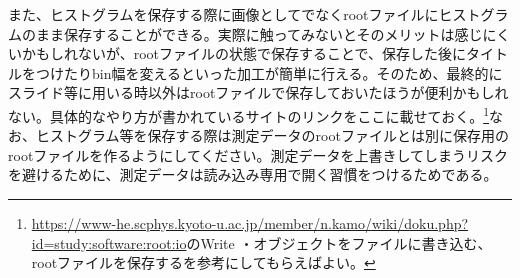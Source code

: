 また、ヒストグラムを保存する際に画像としてでなくrootファイルにヒストグラムのまま保存することができる。実際に触ってみないとそのメリットは感じにくいかもしれないが、rootファイルの状態で保存することで、保存した後にタイトルをつけたりbin幅を変えるといった加工が簡単に行える。そのため、最終的にスライド等に用いる時以外はrootファイルで保存しておいたほうが便利かもしれない。具体的なやり方が書かれているサイトのリンクをここに載せておく。\footnote{\url{https://www-he.scphys.kyoto-u.ac.jp/member/n.kamo/wiki/doku.php?id=study:software:root:io}のWrite ・オブジェクトをファイルに書き込む、rootファイルを保存するを参考にしてもらえばよい。}なお、ヒストグラム等を保存する際は測定データのrootファイルとは別に保存用のrootファイルを作るようにしてください。測定データを上書きしてしまうリスクを避けるために、測定データは読み込み専用で開く習慣をつけるためである。
